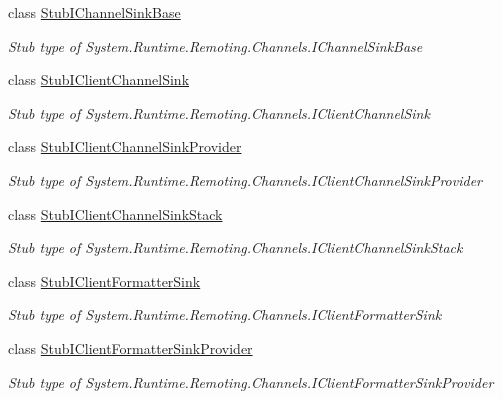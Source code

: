 \begin{DoxyCompactItemize}
class \hyperlink{class_system_1_1_runtime_1_1_remoting_1_1_channels_1_1_fakes_1_1_stub_i_channel_sink_base}{Stub\-I\-Channel\-Sink\-Base}
\begin{DoxyCompactList}\small\item\em Stub type of System.\-Runtime.\-Remoting.\-Channels.\-I\-Channel\-Sink\-Base\end{DoxyCompactList}\item 
class \hyperlink{class_system_1_1_runtime_1_1_remoting_1_1_channels_1_1_fakes_1_1_stub_i_client_channel_sink}{Stub\-I\-Client\-Channel\-Sink}
\begin{DoxyCompactList}\small\item\em Stub type of System.\-Runtime.\-Remoting.\-Channels.\-I\-Client\-Channel\-Sink\end{DoxyCompactList}\item 
class \hyperlink{class_system_1_1_runtime_1_1_remoting_1_1_channels_1_1_fakes_1_1_stub_i_client_channel_sink_provider}{Stub\-I\-Client\-Channel\-Sink\-Provider}
\begin{DoxyCompactList}\small\item\em Stub type of System.\-Runtime.\-Remoting.\-Channels.\-I\-Client\-Channel\-Sink\-Provider\end{DoxyCompactList}\item 
class \hyperlink{class_system_1_1_runtime_1_1_remoting_1_1_channels_1_1_fakes_1_1_stub_i_client_channel_sink_stack}{Stub\-I\-Client\-Channel\-Sink\-Stack}
\begin{DoxyCompactList}\small\item\em Stub type of System.\-Runtime.\-Remoting.\-Channels.\-I\-Client\-Channel\-Sink\-Stack\end{DoxyCompactList}\item 
class \hyperlink{class_system_1_1_runtime_1_1_remoting_1_1_channels_1_1_fakes_1_1_stub_i_client_formatter_sink}{Stub\-I\-Client\-Formatter\-Sink}
\begin{DoxyCompactList}\small\item\em Stub type of System.\-Runtime.\-Remoting.\-Channels.\-I\-Client\-Formatter\-Sink\end{DoxyCompactList}\item 
class \hyperlink{class_system_1_1_runtime_1_1_remoting_1_1_channels_1_1_fakes_1_1_stub_i_client_formatter_sink_provider}{Stub\-I\-Client\-Formatter\-Sink\-Provider}
\begin{DoxyCompactList}\small\item\em Stub type of System.\-Runtime.\-Remoting.\-Channels.\-I\-Client\-Formatter\-Sink\-Provider\end{DoxyCompactList}\item 

\end{DoxyCompactItemize}
